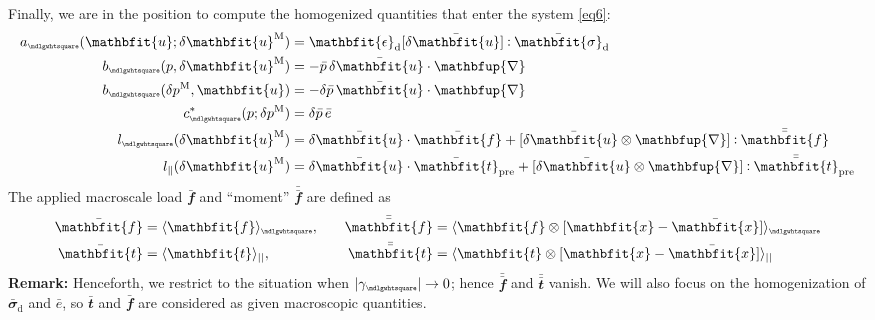 \documentclass[12pt,a4paper]{article}
\renewcommand{\ta}[1]{\mathbfit{#1}}
\renewcommand{\ts}[1]{\mathbfit{#1}}
\renewcommand{\diff}{\mathbfup{\nabla}}
\renewcommand{\Box}{\mdlgwhtsquare}
\DeclarePairedDelimiter{\homgen}{\langle}{\rangle_\rve}
\newcommand{\prescribed}{\mathrm{pre}}
\renewcommand{\dev}{\mathrm{d}}
\newcommand{\rve}{
  {\mathchoice
   {\mbox{\scalebox{0.67}{$\Box$}}}
   {\mbox{\scalebox{0.67}{$\Box$}}}
   {\mbox{\scalebox{0.5}{$\Box$}}}
   {\mbox{\scalebox{0.375}{$\Box$}}}
  }
}
\begin{document}
Finally, we are in the position to compute the homogenized quantities that enter the system \cref{eq6}:
\begin{align}
    a_\rve(\ta{u};\delta\ta{u}^\macro) &=
    \ts{\epsilon}_\dev[\delta\bar{\ta{u}}] \dprod \bar{\ts{\sigma}}_\dev
\label{eq15a} \\
    b_\rve(p,\delta\ta{u}^\macro) &=
    - \bar{p}\,\delta\bar{\ta{u}}\cdot\diff
\label{eq15b} \\
    b_\rve(\delta p^\macro,\ta{u}) &=
    - \delta\bar{p}\,\bar{\ta{u}}\cdot\diff
\label{eq15c} \\
    c^*_\rve(p;\delta p^\macro) &=
    \delta\bar{p}\,\bar{e}
\label{eq15d} \\
    l_\rve(\delta\ta{u}^\macro) &=
    \delta\bar{\ta{u}}\cdot \bar{\ta f} + [\delta\bar{\ta{u}}\outerp\diff]\dprod \bar{\bar{\ta f}}
\label{eq15e} \\
    l_\parallel(\delta\ta{u}^\macro) &=
    \delta\bar{\ta{u}} \cdot \bar{\ta t}_\prescribed + [\delta\bar{\ta u}\outerp\diff]\dprod \bar{\bar{\ta{t}}}_\prescribed
\label{eq15f}
\end{align}
The applied macroscale load $\bar{\ta f}$ and ``moment'' $\bar{\bar{\ta f}}$ are defined as
\begin{alignat}{2}
    \bar{\ta f} &= \homgen{ \ta{f} },\quad
    &\bar{\bar{\ta f}} &= \homgen{ \ta{f}\outerp[\ta{x}-\bar{\ta{x}}] }
\label{eq15fa}
\\
    \bar{\ta t} &= \langle \ta{t} \rangle_{||},\quad
    &\bar{\bar{\ta t}} &= \langle \ta{t}\outerp[\ta{x}-\bar{\ta{x}}]  \rangle_{||}
\end{alignat}
\textbf{Remark:} Henceforth, we restrict to the situation when $|\gamma_\rve|\to 0$; hence $\bar{\bar{\ta f}}$ and $\bar{\bar{\ta t}}$ vanish.
We will also focus on the homogenization of $\bar{\ts\sigma}_\dev$ and $\bar{e}$, so $\bar{\ta t}$ and $\bar{\ta f}$ are considered as given macroscopic quantities.
\end{document}
